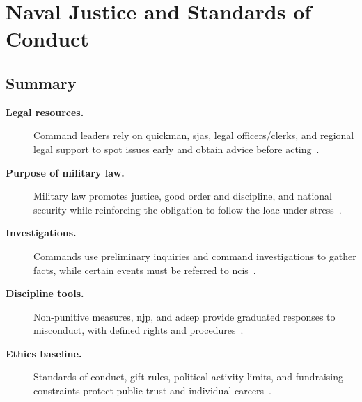 \documentclass[../main.tex]{subfiles}
\begin{document}
\section{Naval Justice and Standards of Conduct}

\subsection{Summary}
\begin{description}
  \item[\textbf{Legal resources.}] Command leaders rely on \ac{quickman}, \acp{sja}, legal officers/clerks, and regional legal support to spot issues early and obtain advice before acting~\autocite{edo-5-1-1-naval-justice-standards-2025}.
  \item[\textbf{Purpose of military law.}] Military law promotes justice, good order and discipline, and national security while reinforcing the obligation to follow the \ac{loac} under stress~\autocite{edo-5-1-1-naval-justice-standards-2025}.
  \item[\textbf{Investigations.}] Commands use preliminary inquiries and command investigations to gather facts, while certain events must be referred to \ac{ncis}~\autocite{edo-5-1-1-naval-justice-standards-2025}.
  \item[\textbf{Discipline tools.}] Non-punitive measures, \ac{njp}, and \ac{adsep} provide graduated responses to misconduct, with defined rights and procedures~\autocite{edo-5-1-1-naval-justice-standards-2025}.
  \item[\textbf{Ethics baseline.}] Standards of conduct, gift rules, political activity limits, and fundraising constraints protect public trust and individual careers~\autocite{edo-5-1-1-naval-justice-standards-2025,OGE-Standards-Ethical-Conduct-2024,DoD-SOCO-Ethics-Laws-Regulations-2026}.
\end{description}
\end{document}

